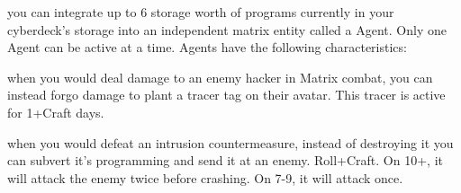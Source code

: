 \begin{dossier}
\begin{dossiermovebar}
 you can integrate up to 6 storage worth of programs currently in
your cyberdeck’s storage into an independent matrix entity called a Agent. Only one Agent
can be active at a time. Agents have the following
characteristics:
\begin{moveoptions}



\end{moveoptions}

 when you would deal damage to an enemy hacker in Matrix combat, you can
instead forgo damage to plant a tracer tag on their avatar. This tracer is active for 1+Craft
days.

 when you would defeat an intrusion countermeasure, instead of destroying it you can subvert it’s programming and send it at an enemy. Roll+Craft. On 10+, it will
attack the enemy twice before crashing. On 7-9, it will attack once.

\end{dossiermovebar}%
\end{dossier}

